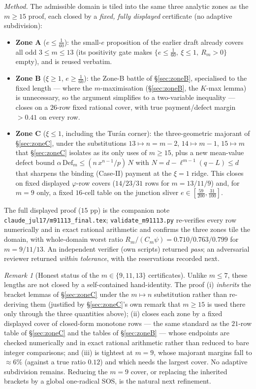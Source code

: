 \documentclass[11pt]{article}
\theoremstyle{remark}
\newtheorem{remark}[theorem]{Remark}
\theoremstyle{plain}
\theoremstyle{plain}
\begin{document}
\emph{Method.}  The admissible domain is tiled into the same three analytic
zones as the $m\ge15$ proof, each closed by a \emph{fixed, fully displayed}
certificate (no adaptive subdivision):
\begin{itemize}[leftmargin=1.6em]
\item \textbf{Zone A} ($e\le\tfrac1{60}$): the small-$e$ proposition of the
earlier draft already covers all odd $3\le m\le13$ (its positivity gate makes
$\{e\le\tfrac1{60},\ \xi\le1,\ R_m>0\}$ empty), and is reused verbatim.
\item \textbf{Zone B} ($\xi\ge1$, $e\ge\tfrac1{60}$): the Zone-B battle of
\S\ref{sec:zoneB}, specialised to the fixed length --- where the
$m$-maximisation (\S\ref{sec:zoneB}, the $K$-max lemma) is unnecessary, so the
argument simplifies to a two-variable inequality --- closes on a $26$-row fixed
rational cover, with true payment/defect margin $>0.41$ on every row.
\item \textbf{Zone C} ($\xi\le1$, including the Tur\'an corner): the
three-geometric majorant of \S\ref{sec:zoneC}, under the substitutions
$13\mapsto n=m-2$, $14\mapsto m-1$, $15\mapsto m$ that \S\ref{sec:zoneC}
isolates as its only uses of $m\ge15$, plus a new mean-value defect bound
$\alpha\,\mathrm{Def}_m\le (n\,x^{n-1}/p)\,N$ with $N=d-\ell^{m-1}(q-L)\le d$
that sharpens the binding (Case-II) payment at the $\xi=1$ ridge.  This closes
on fixed displayed $\varphi$-row covers ($14/23/31$ rows for $m=13/11/9$) and,
for $m=9$ only, a fixed $16$-cell table on the junction sliver
$e\in[\tfrac{59}{200},\tfrac{31}{100}]$.
\end{itemize}
The full displayed proof ($15$ pp) is the companion note
\texttt{claude\_jul17/m91113\_final.tex}; \texttt{validate\_m91113.py}
re-verifies every row numerically and in exact rational arithmetic and confirms
the three zones tile the domain, with whole-domain worst ratio
$R_m/(C_m\psi)=0.710/0.763/0.799$ for $m=9/11/13$.  An independent verifier
(own scripts) returned \emph{pass}; an adversarial reviewer returned
\emph{within tolerance}, with the reservations recorded next.

\begin{remark}[Honest status of the $m\in\{9,11,13\}$ certificates]\label{rem:smallm-91113-status}
Unlike $m\le7$, these lengths are not closed by a self-contained hand-identity.
The proof (i) \emph{inherits} the bracket lemmas of \S\ref{sec:zoneC} under the
$m\mapsto n$ substitution rather than re-deriving them (justified by
\S\ref{sec:zoneC}'s own remark that $m\ge15$ is used there only through the
three quantities above); (ii) closes each zone by a fixed displayed cover of
closed-form monotone rows --- the same standard as the $21$-row table of
\S\ref{sec:zoneC} and the tables of \S\ref{sec:zoneB} --- whose endpoints are
checked numerically and in exact rational arithmetic rather than reduced to bare
integer comparisons; and (iii) is tightest at $m=9$, whose majorant margins fall
to $\approx6\%$ (against a true ratio $0.12$) and which needs the largest cover.
No adaptive subdivision remains.  Reducing the $m=9$ cover, or replacing the
inherited brackets by a global one-radical SOS, is the natural next refinement.
\end{remark}
\end{document}
